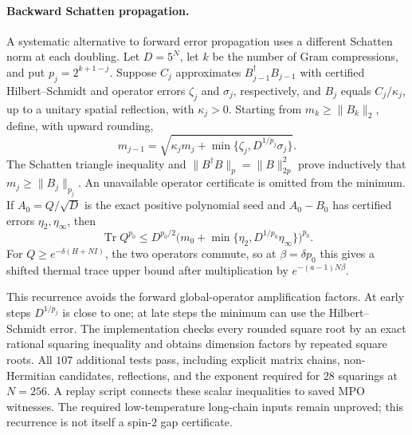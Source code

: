 \documentclass[11pt]{article}
\begin{document}
\paragraph{Backward Schatten propagation.}
A systematic alternative to forward error propagation uses a different
Schatten norm at each doubling. Let $D=5^N$, let $k$ be the number of
Gram compressions, and put $p_j=2^{k+1-j}$. Suppose $C_j$ approximates
$B_{j-1}^\dagger B_{j-1}$ with certified Hilbert--Schmidt and operator
errors $\zeta_j$ and $\sigma_j$, respectively, and $B_j$ equals
$C_j/\kappa_j$, up to a unitary spatial reflection, with $\kappa_j>0$.
Starting from $m_k\geq\lVert B_k\rVert_2$, define, with upward rounding,
\[
 m_{j-1}=\sqrt{\kappa_jm_j+
       \min\{\zeta_j,D^{1/p_j}\sigma_j\}}.
\]
The Schatten triangle inequality and
$\lVert B^\dagger B\rVert_p=\lVert B\rVert_{2p}^2$ prove inductively that
$m_j\geq\lVert B_j\rVert_{p_j}$. An unavailable operator certificate
is omitted from the minimum. If $A_0=Q/\sqrt D$ is the exact positive
polynomial seed and $A_0-B_0$ has certified errors $\eta_2,\eta_\infty$,
then
\[
 \operatorname{Tr}Q^{p_0}
 \leq D^{p_0/2}
 \bigl(m_0+\min\{\eta_2,D^{1/p_0}\eta_\infty\}\bigr)^{p_0}.
\]
For $Q\geq e^{-\delta(H+NI)}$, the two operators commute, so at
$\beta=\delta p_0$ this gives a shifted thermal trace upper bound after
multiplication by $e^{-(a-1)N\beta}$.

This recurrence avoids the forward global-operator amplification factors.
At early steps $D^{1/p_j}$ is close to one; at late steps the minimum
can use the Hilbert--Schmidt error. The implementation checks every
rounded square root by an exact rational squaring inequality and obtains
dimension factors by repeated square roots. All $107$ additional tests
pass, including explicit matrix chains, non-Hermitian candidates,
reflections, and the exponent required for $28$ squarings at $N=256$.
A replay script connects these scalar inequalities to saved MPO witnesses.
The required low-temperature long-chain inputs remain unproved; this
recurrence is not itself a spin-$2$ gap certificate.
\end{document}
